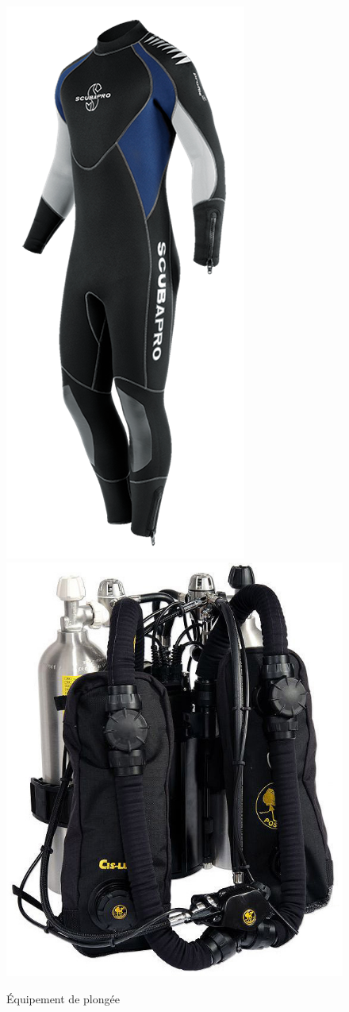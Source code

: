 \begin{figure}[!ht]
	\center	
	\includegraphics[scale=0.2]{image/plonge1.png}
	\includegraphics[scale=0.15]{image/plonge2.jpg}
	\caption{Équipement de plongée}
\end{figure}